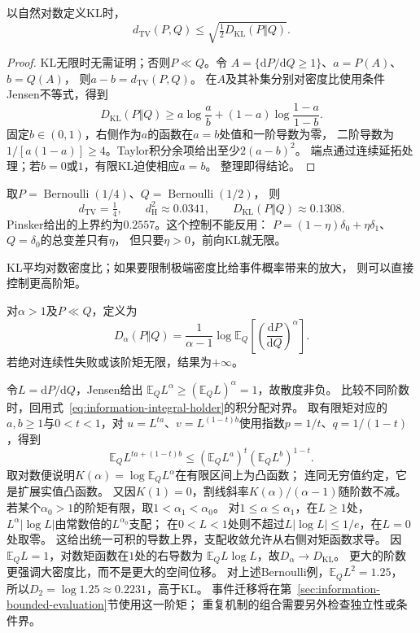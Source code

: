 \begin{theorem}[Pinsker不等式]
\label{thm:information-pinsker}
以自然对数定义KL时，
\begin{equation}
  d_{\mathrm{TV}}(P,Q)\leq
  \sqrt{\tfrac12D_{\mathrm{KL}}(P\Vert Q)}.
  \label{eq:information-pinsker}
\end{equation}
\end{theorem}
\begin{proof}
KL无限时无需证明；否则\(P\ll Q\)。令
\(A=\{\mathrm dP/\mathrm dQ\geq1\}\)、\(a=P(A)\)、\(b=Q(A)\)，
则\(a-b=d_{\mathrm{TV}}(P,Q)\)。
在\(A\)及其补集分别对密度比使用条件Jensen不等式，得到
\[
  D_{\mathrm{KL}}(P\Vert Q)\geq
  a\log\frac ab+(1-a)\log\frac{1-a}{1-b}.
\]
固定\(b\in(0,1)\)，右侧作为\(a\)的函数在\(a=b\)处值和一阶导数为零，
二阶导数为\(1/[a(1-a)]\geq4\)。Taylor积分余项给出至少\(2(a-b)^2\)。
端点通过连续延拓处理；若\(b=0\)或\(1\)，有限KL迫使相应\(a=b\)。
整理即得结论。
\end{proof}

取\(P=\operatorname{Bernoulli}(1/4)\)、\(Q=\operatorname{Bernoulli}(1/2)\)，
则
\[
  d_{\mathrm{TV}}=\tfrac14,\qquad
  d_{\mathrm H}^2\approx0.0341,\qquad
  D_{\mathrm{KL}}(P\Vert Q)\approx0.1308.
\]
Pinsker给出的上界约为\(0.2557\)。这个控制不能反用：
\(P=(1-\eta)\delta_0+\eta\delta_1\)、\(Q=\delta_0\)的总变差只有\(\eta\)，
但只要\(\eta>0\)，前向KL就无限。

KL平均对数密度比；如果要限制极端密度比给事件概率带来的放大，
则可以直接控制更高阶矩。

\begin{definition}[高于一阶的Rényi散度]
\label{def:information-renyi-divergence}
对\(\alpha>1\)及\(P\ll Q\)，定义为
\begin{equation}
  D_\alpha(P\Vert Q)
   =\frac1{\alpha-1}\log\mathbb E_Q
       \left[\left(\frac{\mathrm dP}{\mathrm dQ}\right)^\alpha\right].
  \label{eq:information-renyi-divergence}
\end{equation}
若绝对连续性失败或该阶矩无限，结果为\(+\infty\)。
\end{definition}

令\(L=\mathrm dP/\mathrm dQ\)，Jensen给出
\(\mathbb E_Q L^\alpha\geq(\mathbb E_QL)^\alpha=1\)，故散度非负。
比较不同阶数时，回用式~\eqref{eq:information-integral-holder}的积分配对界。
取有限矩对应的\(a,b\geq1\)与\(0<t<1\)，对
\(u=L^{ta}\)、\(v=L^{(1-t)b}\)使用指数\(p=1/t\)、\(q=1/(1-t)\)，得到
\[
 \mathbb E_Q L^{ta+(1-t)b}
 \leq(\mathbb E_Q L^a)^t(\mathbb E_Q L^b)^{1-t}.
\]
取对数便说明\(K(\alpha)=\log\mathbb E_QL^\alpha\)在有限区间上为凸函数；
连同无穷值约定，它是扩展实值凸函数。
又因\(K(1)=0\)，割线斜率\(K(\alpha)/(\alpha-1)\)随阶数不减。
若某个\(\alpha_0>1\)的阶矩有限，取\(1<\alpha_1<\alpha_0\)。
对\(1\leq\alpha\leq\alpha_1\)，在\(L\geq1\)处，
\(L^\alpha|\log L|\)由常数倍的\(L^{\alpha_0}\)支配；
在\(0<L<1\)处则不超过\(L|\log L|\leq1/e\)，在\(L=0\)处取零。
这给出统一可积的导数上界，支配收敛允许从右侧对矩函数求导。
因\(\mathbb E_Q L=1\)，对数矩函数在\(1\)处的右导数为
\(\mathbb E_Q L\log L\)，故\(D_\alpha\to D_{\mathrm{KL}}\)。
更大的阶数更强调大密度比，而不是更大的空间位移。
对上述Bernoulli例，\(\mathbb E_QL^2=1.25\)，
所以\(D_2=\log1.25\approx0.2231\)，高于KL。
事件迁移将在第~\ref{sec:information-bounded-evaluation}节使用这一阶矩；
重复机制的组合需要另外检查独立性或条件界。


